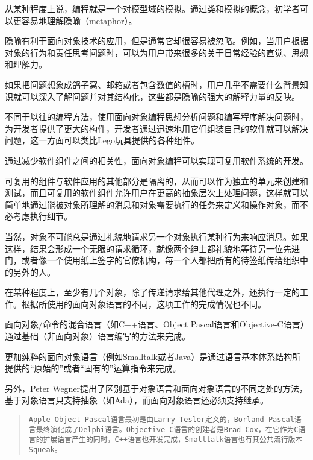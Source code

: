 从某种程度上说，编程就是一个对模型域的模拟。通过类和模拟的概念，初学者可以更容易地理解隐喻（metaphor）。

隐喻有利于面向对象技术的应用，但是通常它却很容易被忽略。例如，当用户根据对象的行为和责任思考问题时，可以为用户带来很多的关于日常经验的直觉、思想和理解力。

如果把问题想象成鸽子窝、邮箱或者包含数值的槽时，用户几乎不需要什么背景知识就可以深入了解问题并对其结构化，这些都是隐喻的强大的解释力量的反映。

不同于以往的编程方法，使用面向对象编程思想分析问题和编写程序解决问题时，为开发者提供了更大的构件，开发者通过迅速地用它们组装自己的软件就可以解决问题，这一方面可以类比Lego玩具提供的各种组件。

通过减少软件组件之间的相关性，面向对象编程可以实现可复用软件系统的开发。

可复用的组件与软件应用的其他部分是隔离的，从而可以作为独立的单元来创建和测试，而且可复用的软件组件允许用户在更高的抽象层次上处理问题，这样就可以简单地通过能被对象所理解的消息和对象需要执行的任务来定义和操作对象，而不必考虑执行细节。

当然，对象不可能总是通过礼貌地请求另一个对象执行某种行为来响应消息。如果这样，结果会形成一个无限的请求循环，就像两个绅士都礼貌地等待另一位先进门，或者像一个使用纸上签字的官僚机构，每一个人都把所有的待签纸传给组织中的另外的人。

在某种程度上，至少有几个对象，除了传递请求给其他代理之外，还执行一定的工作。根据所使用的面向对象语言的不同，这项工作的完成情况也不同。

\begin{compactitem}
\item 面向对象/命令的混合语言（如C++语言、Object Pascal语言和Objective-C语言）通过基础（非面向对象）语言编写的方法来完成。

\item 更加纯粹的面向对象语言（例如Smalltalk或者Java）是通过语言基本体系结构所提供的“原始的”或者“固有的”运算指令来完成。
\end{compactitem}

另外，Peter Wegner提出了区别基于对象语言和面向对象语言的不同之处的方法，基于对象语言只支持抽象（如Ada），而面向对象语言还必须支持继承。

\begin{quote}
\texttt{Apple Object Pascal语言最初是由Larry Tesler定义的，Borland Pascal语言最终演化成了Delphi语言。Objective-C语言的创建者是Brad Cox，在它作为C语言的扩展语言产生的同时，C++语言也开发完成，Smalltalk语言也有其公共流行版本Squeak。}
\end{quote}

